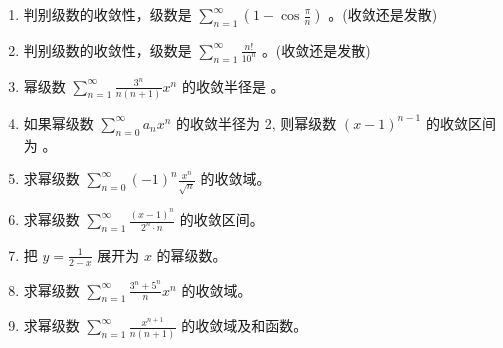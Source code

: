 \documentclass[12pt, a4paper]{article}
\begin{document}
\begin{enumerate}
    \item 判别级数的收敛性，级数是 $ \sum_{n=1}^{\infty}(1-\cos\frac{\pi}{n}) $ \underline{\hspace{2cm}}。(收敛还是发散)

    \item 判别级数的收敛性，级数是 $ \sum_{n=1}^{\infty}\frac{n!}{10^{n}} $ \underline{\hspace{2cm}}。(收敛还是发散)

    \item 幂级数 $ \sum_{n=1}^{\infty}\frac{3^{n}}{n(n+1)}x^{n} $ 的收敛半径是 \underline{\hspace{2cm}}。

    \item 如果幂级数 $ \sum_{n=0}^{\infty} a_{n} x^{n} $ 的收敛半径为 2, 则幂级数 $ (x-1)^{n-1} $ 的收敛区间为 \underline{\hspace{2cm}}。

    \item 求幂级数 $ \sum_{n=0}^{\infty} (-1)^{n} \frac{x^{n}}{\sqrt{n}} $ 的收敛域。

    \item 求幂级数 $ \sum_{n=1}^{\infty} \frac{(x-1)^{n}}{2^{n} \cdot n} $ 的收敛区间。

    \item 把 $ y = \frac{1}{2-x} $ 展开为 $x$ 的幂级数。

    \item 求幂级数 $ \sum_{n=1}^{\infty} \frac{3^{n} + 5^{n}}{n} x^{n} $ 的收敛域。

    \item 求幂级数 $ \sum_{n=1}^{\infty} \frac{x^{n+1}}{n(n+1)} $ 的收敛域及和函数。
\end{enumerate}
\end{document}
